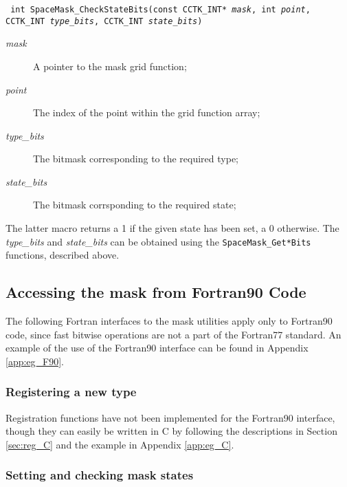 \documentclass{article}
\begin{document}
\indent\parbox{\linewidth}{
\vspace{\baselineskip}\noindent\texttt{
int SpaceMask\_CheckStateBits(const CCTK\_INT* \emph{mask}, int \emph{point},
  \\\hspace*{10mm}
  CCTK\_INT \emph{type\_bits}, CCTK\_INT \emph{state\_bits})
}\\
\hspace*{10mm}\parbox{\linewidth}{
\begin{description}
  \item[\emph{mask}] A pointer to the mask grid function;
  \item[\emph{point}] The index of the point within the grid function
    array;
  \item[\emph{type\_bits}] The bitmask corresponding to the required
    type;
  \item[\emph{state\_bits}] The bitmask corrsponding to the required
    state;
\end{description}
}}

\noindent The latter macro returns a 1 if the given state has been
set, a 0 otherwise. The \emph{type\_bits} and \emph{state\_bits} can
be obtained using the \texttt{SpaceMask\_Get*Bits} functions,
described above.

\subsection{Accessing the mask from Fortran90 Code}

The following Fortran interfaces to the mask utilities apply only to
Fortran90 code, since fast bitwise operations are not a part of the
Fortran77 standard. An example of the use of the Fortran90 interface
can be found in Appendix \ref{app:eg_F90}.

\subsubsection{Registering a new type}

Registration functions have not been implemented for the Fortran90
interface, though they can easily be written in C by following the
descriptions in Section \ref{sec:reg_C} and the example in Appendix
\ref{app:eg_C}.

\subsubsection{Setting and checking mask states}
\end{document}
